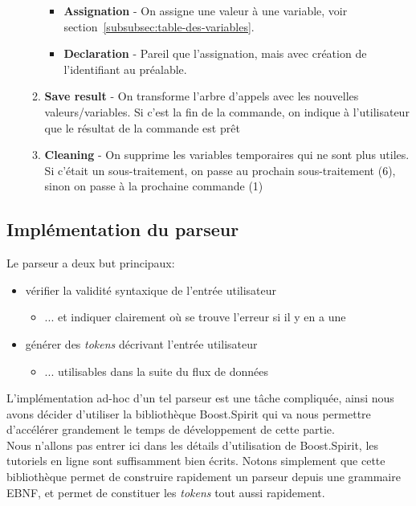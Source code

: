 \documentclass[french]{article}
\begin{document}
\begin{enumerate}
\begin{enumerate}
\begin{itemize}
						\item \textbf{Assignation} - On assigne une valeur à une variable, voir section~\ref{subsubsec:table-des-variables}.
						\item \textbf{Declaration} - Pareil que l'assignation, mais avec création de l'identifiant au préalable.
					\end{itemize}
					\item \textbf{Save result} - On transforme l'arbre d'appels avec les nouvelles valeurs/variables. Si c'est la fin de la commande, on indique à l'utilisateur que le résultat de la commande est prêt
					\item \textbf{Cleaning} - On supprime les variables temporaires qui ne sont plus utiles. Si c'était un sous-traitement, on passe au prochain sous-traitement (6), sinon on passe à la prochaine commande (1)
				\end{enumerate}
			\end{enumerate}
			
		\subsection{Implémentation du parseur}
			\label{subsec:implementation-du-parseur}
			Le parseur a deux but principaux:
			
			\begin{itemize}
				\item vérifier la validité syntaxique de l'entrée utilisateur
				\begin{itemize}
					\item ... et indiquer clairement où se trouve l'erreur si il y en a une
				\end{itemize}
				\item générer des \textit{tokens} décrivant l'entrée utilisateur
				\begin{itemize}
					\item ... utilisables dans la suite du flux de données\\
				\end{itemize}
			\end{itemize}
			
			L'implémentation ad-hoc d'un tel parseur est une tâche compliquée, ainsi nous avons décider d'utiliser la bibliothèque Boost.Spirit \cite{boost.spirit} qui va nous permettre d'accélérer grandement le temps de développement de cette partie.\\
			
			Nous n'allons pas entrer ici dans les détails d'utilisation de Boost.Spirit, les tutoriels en ligne sont suffisamment bien écrits. Notons simplement que cette bibliothèque permet de construire rapidement un parseur depuis une grammaire EBNF, et permet de constituer les \textit{tokens} tout aussi rapidement.\\
			
\end{document}
